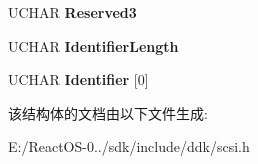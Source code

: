 \begin{DoxyCompactItemize}
U\+C\+H\+AR {\bfseries Reserved3}
\item 
\mbox{\label{struct___v_p_d___i_d_e_n_t_i_f_i_c_a_t_i_o_n___d_e_s_c_r_i_p_t_o_r_a4b45a421f10a977ec670bc2814728514}} 
U\+C\+H\+AR {\bfseries Identifier\+Length}
\item 
\mbox{\label{struct___v_p_d___i_d_e_n_t_i_f_i_c_a_t_i_o_n___d_e_s_c_r_i_p_t_o_r_a55cac99f461e61b7bea9ad8c195f4710}} 
U\+C\+H\+AR {\bfseries Identifier} \mbox{[}0\mbox{]}
\end{DoxyCompactItemize}


该结构体的文档由以下文件生成\+:\begin{DoxyCompactItemize}
\item 
E\+:/\+React\+O\+S-\/0../sdk/include/ddk/scsi.\+h\end{DoxyCompactItemize}
